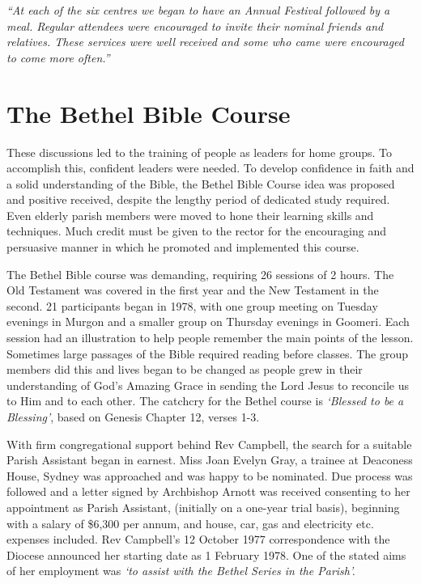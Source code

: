 \emph{``At each of the six centres we began to have an Annual Festival followed by a meal. Regular attendees were encouraged to invite their nominal friends and relatives. These services were well received and some who came were encouraged to come more often.''}



\section{The Bethel Bible Course}



These discussions led to the training of people as leaders for home groups. To accomplish this, confident leaders were needed. To develop confidence in faith and a solid understanding of the Bible, the Bethel Bible Course idea was proposed and positive received, despite the lengthy period of dedicated study required. Even elderly parish members were moved to hone their learning skills and techniques. Much credit must be given to the rector for the encouraging and persuasive manner in which he promoted and implemented this course.



The Bethel Bible course was demanding, requiring 26 sessions of 2  hours. The Old Testament was covered in the first year and the New Testament in the second. 21 participants began in 1978, with one group meeting on Tuesday evenings in Murgon and a smaller group on Thursday evenings in Goomeri. Each session had an illustration to help people remember the main points of the lesson. Sometimes large passages of the Bible required reading before classes. The group members did this and lives began to be changed as people grew in their understanding of God's Amazing Grace in sending the Lord Jesus to reconcile us to Him and to each other. The catchcry for the Bethel course is \emph{`Blessed to be a Blessing'}, based on Genesis Chapter 12, verses 1-3.



With firm congregational support behind Rev Campbell, the search for a suitable Parish Assistant began in earnest. Miss Joan Evelyn Gray, a trainee at Deaconess House, Sydney was approached and was happy to be nominated. Due process was followed and a letter signed by Archbishop Arnott was received consenting to her appointment as Parish Assistant, (initially on a one-year trial basis), beginning with a salary of \$6,300 per annum, and house, car, gas and electricity etc. expenses included. Rev Campbell's 12 October 1977 correspondence with the Diocese announced her starting date as 1 February 1978. One of the stated aims of her employment was \emph{`to assist with the Bethel Series in the Parish'.}









